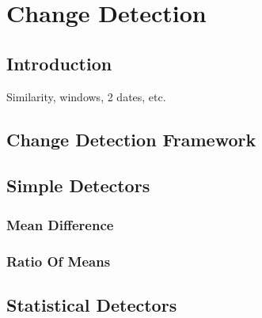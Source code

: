 \chapter{Change Detection}
\section{Introduction}
Similarity, windows, 2 dates, etc.
\section{Change Detection Framework}
\label{sec:ChangeDetectionFramework}

\section{Simple Detectors}
\label{sec:SimpleDetectors}
\subsection{Mean Difference}
\label{sec:MeanDifference}

\subsection{Ratio Of Means}
\label{sec:RatioOfMeans}


\section{Statistical Detectors}
\label{sec:StatisticalDetectors}
